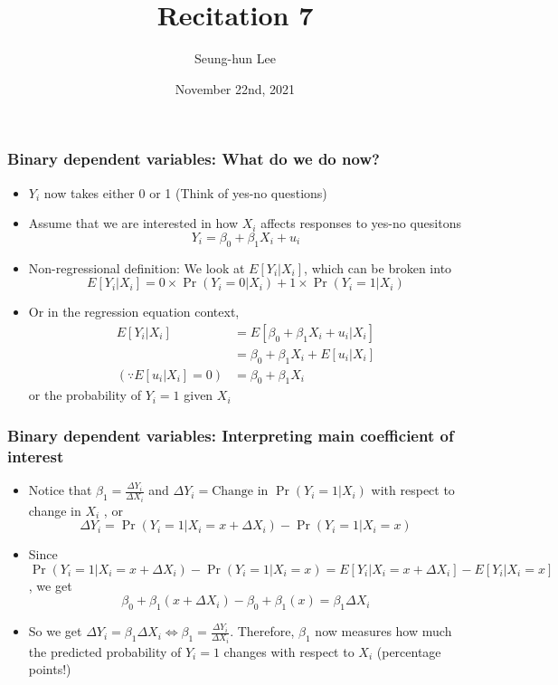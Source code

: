 \documentclass[aspectratio=169]{beamer}
\title[Recitation 7]{Recitation 7} %
\author[Seung-hun Lee]{Seung-hun Lee}
\institute[Columbia University]{Columbia University}
\date[November 22nd, 2021]{November 22nd, 2021}
\begin{document}
\begin{frame}
\titlepage
\end{frame}


\begin{frame}
\frametitle{Binary dependent variables: What do we do now?}
\begin{itemize}
\item $Y_i$ now  takes either 0 or 1 (Think of yes-no questions)
\item Assume that we are interested in how $X_i$ affects responses to yes-no quesitons
\[
Y_i = \beta_0 + \beta_1 X_i +u_i
\]
\item Non-regressional definition: We look at $E[Y_i|X_i]$, which can be broken into 
\[
E[Y_i|X_i] = 0\times\Pr(Y_i=0|X_i)+1\times\Pr(Y_i=1|X_i)
\]
\item Or in the regression equation context, 
\[
\begin{aligned}
E[Y_i|X_i]&=E[\beta_0+\beta_1X_i+u_i|X_i]\\
&=\beta_0 + \beta_1X_i + E[u_i|X_i]\\
(\because  E[u_i|X_i]=0)&=\beta_0 + \beta_1X_i 
\end{aligned}
\]
or the probability of $Y_i=1$ given $X_i$
\end{itemize}
\end{frame}

\begin{frame}
\frametitle{Binary dependent variables: Interpreting main coefficient of interest}
\begin{itemize}
\item Notice that $\beta_1 =\frac{\Delta Y_i}{\Delta X_i}$ and $\Delta Y_i = \text{Change in }\Pr(Y_i=1|X_i)$ with respect to change in $X_i$ , or
\[
\Delta Y_i = \Pr(Y_i=1|X_i=x+\Delta X_i)-\Pr(Y_i=1|X_i=x)
\]
\item Since $\Pr(Y_i=1|X_i=x+\Delta X_i)-\Pr(Y_i=1|X_i=x)=E[Y_i|X_i=x+\Delta X_i]-E[Y_i|X_i=x]$, we get
\[
\beta_0+\beta_1(x+\Delta X_i)-\beta_0+\beta_1(x) =\beta_1 \Delta X_i
\]
\item So we get $\Delta Y_i = \beta_1\Delta X_i\iff\beta_1 =\frac{\Delta Y_i}{\Delta X_i}$. Therefore, $\beta_1$ now measures how much the predicted probability of $Y_i=1$ changes with respect to $X_i$ (percentage points!)
\end{itemize}
\end{frame}
\end{document}

